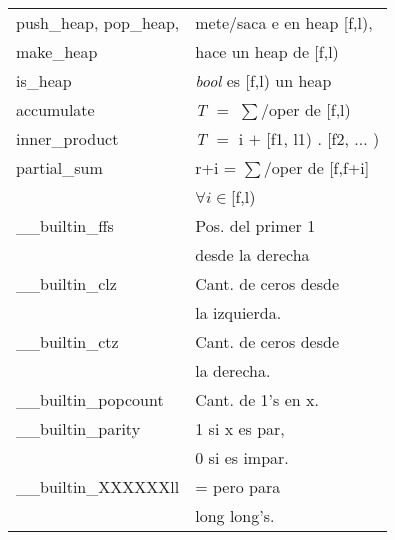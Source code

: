 \begin{tabular}{|l|p{4.7cm}|}
push\_heap, pop\_heap, & mete/saca e en heap [f,l), \\
make\_heap & hace un heap de [f,l)\\\hline
is\_heap &  \textit{bool} es [f,l) un heap\\\hline
accumulate  & \textit{T} $=$ $\sum$/oper de [f,l)\\\hline
inner\_product & \textit{T} $=$ i $+$ [f1, l1) . [f2, $\ldots$ )\\\hline
partial\_sum & r+i = $\sum$/oper de [f,f+i] \\ & $\forall i \in$[f,l)\\\hline
\_\_builtin\_ffs& Pos. del primer 1\\ & desde la derecha\\\hline
\_\_builtin\_clz & Cant. de ceros desde\\ & la izquierda.\\\hline
\_\_builtin\_ctz& Cant. de ceros desde\\ & la derecha.\\\hline
\_\_builtin\_popcount & Cant. de 1’s en x.\\\hline
\_\_builtin\_parity & 1 si x es par, \\ & 0 si es impar.\\\hline
\_\_builtin\_XXXXXXll & = pero para \\ & long long's.\\\hline
\end{tabular}\newpage
